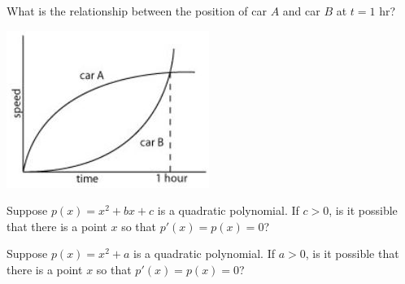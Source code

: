 \documentclass{ximera}
\newcommand{\recommendation}[1]{}
\newcommand{\PCA}[1]{}
\begin{document}
\begin{problem}
  \recommendation{Elizabeth}
  \PCA{\#8}
  
  What is the relationship between the position of car $A$ and car $B$
  at $t=1$ hr?
  \begin{image}
    \includegraphics[scale = 1]{speed.jpg}%
  \end{image}
  \begin{multipleChoice}
  \end{multipleChoice}
\end{problem}



\begin{problem}
  Suppose $p(x) = x^2 + bx + c$ is a quadratic polynomial.  If $c > 0$, is it possible that there is a point $x$ so that $p'(x) = p(x) = 0$?
  \begin{multipleChoice}
  \end{multipleChoice}
\end{problem}

\begin{problem}
  Suppose $p(x) = x^2 + a$ is a quadratic polynomial.  If $a > 0$, is it possible that there is a point $x$ so that $p'(x) = p(x) = 0$?
  \begin{multipleChoice}
  \end{multipleChoice}
\end{problem}

\end{document}
